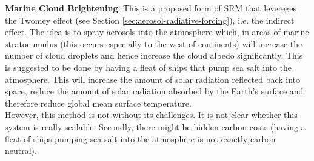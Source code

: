 \noindent \textbf{Marine Cloud Brightening}: This is a proposed form of \gls{SRM} 
that levereges the Twomey effect (see Section \ref{sec:aerosol-radiative-forcing}),
i.e. the indirect effect. The idea is to spray aerosols into the atmosphere which,
in areas of marine stratocumulus (this occurs especially to the west of continents)
will increase the number of cloud droplets and hence increase the cloud albedo 
significantly. This is suggested to be done by having a fleat of ships that pump
sea salt into the atmosphere. This will increase the amount of solar radiation 
reflected back
into space, reduce the amount of solar radiation absorbed by the Earth's surface
and therefore reduce global mean surface temperature. \\

However, this method is not without its challenges. It is not clear whether
this system is really scalable. Secondly, there might be hidden carbon costs 
(having a fleat of ships pumping sea salt into the atmosphere is not exactly
carbon neutral). 
